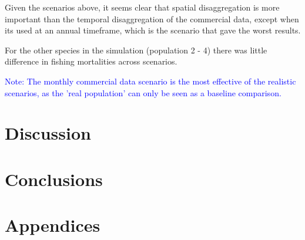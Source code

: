 \documentclass[review]{elsarticle}
\begin{document}
Given the scenarios above, it seems clear that spatial disaggregation is more
important than the temporal disaggregation of the commercial data, except when
its used at an annual timeframe, which is the scenario that gave the worst
results.

For the other species in the simulation (population 2 - 4) there was little
difference in fishing mortalities across scenarios.

\textcolor{blue}{Note: The monthly commercial data scenario is the most
	effective of the realistic scenarios, as the 'real population' can only
	be seen as a baseline comparison.}

\section{Discussion}

\section{Conclusions}

\section*{Appendices}
\end{document}
